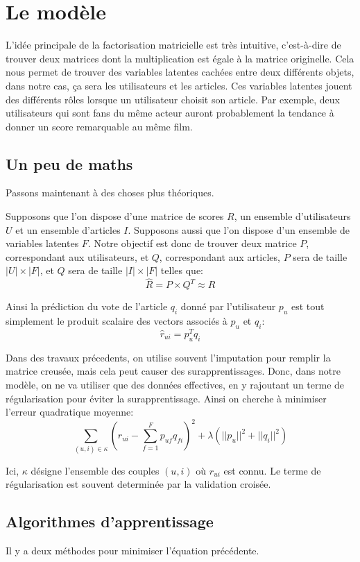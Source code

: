 \documentclass{article}
\theoremstyle{plain}
\theoremstyle{definition}
\theoremstyle{remark}
\begin{document}
\section{Le mod\`ele}
L'id\'ee principale de la factorisation matricielle est tr\`es intuitive, c'est-\`a-dire de trouver deux matrices dont la multiplication est \'egale \`a la matrice originelle. Cela nous permet de trouver des variables latentes cach\'ees entre deux diff\'erents objets, dans notre cas, \c ca sera les utilisateurs et les articles. Ces variables latentes jouent des diff\'erents r\^oles lorsque un utilisateur choisit son article. Par exemple, deux utilisateurs qui sont fans du m\^eme acteur auront probablement la tendance \`a donner un score remarquable au m\^eme film.

\subsection{Un peu de maths}
Passons maintenant \`a des choses plus th\'eoriques.

Supposons que l'on dispose d'une matrice de scores $R$, un ensemble d'utilisateurs $U$ et un ensemble d'articles $I$. Supposons aussi que l'on dispose d'un ensemble de variables latentes $F$. Notre objectif est donc de trouver deux matrice $P$, correspondant aux utilisateurs, et $Q$, correspondant aux articles, $P$ sera de taille $|U|\times|F|$, et $Q$ sera de taille $|I|\times|F|$ telles que:
\[
\hat{R}=P\times Q^T\approx{R}
\]

Ainsi la pr\'ediction du vote de l'article $q_i$ donn\'e par l'utilisateur $p_u$ est tout simplement le produit scalaire des vectors associ\'es \`a $p_u$ et $q_i$:
\[
\hat{r}_{ui}=p_u^T q_i
\]

Dans des travaux pr\'ecedents, on utilise souvent l'imputation pour remplir la matrice creus\'ee, mais cela peut causer des surapprentissages. Donc, dans notre mod\`ele, on ne va utiliser que des donn\'ees effectives, en y rajoutant un terme de r\'egularisation pour \'eviter la surapprentissage. Ainsi on cherche \`a minimiser l'erreur quadratique moyenne:
\[
\sum_{(u,i)\in\kappa}(r_{ui}-\sum_{f=1}^{F}p_{uf}q_{fi})^2+\lambda(||p_u||^2+||q_i||^2)
\]

Ici, $\kappa$ d\'esigne l'ensemble des couples $(u,i)$ o\`u $r_{ui}$ est connu. Le terme de r\'egularisation est souvent determin\'ee par la validation crois\'ee.

\subsection{Algorithmes d'apprentissage}
Il y a deux m\'ethodes pour minimiser l'\'equation pr\'ec\'edente.
\end{document}
